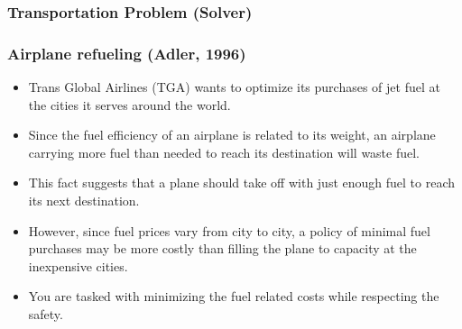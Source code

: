 \documentclass[11pt]{beamer}
\begin{document}
\begin{frame}
\frametitle{Transportation Problem (Solver)}

\end{frame}

\begin{frame}
\frametitle{Airplane refueling (Adler, 1996)}
\begin{itemize}
\item Trans Global Airlines (TGA) wants to optimize its purchases of jet fuel at the cities it serves around the world.
\item Since the fuel efficiency of an airplane is related to its weight, an airplane carrying more fuel than needed to reach its destination will waste fuel.
\item This fact suggests that a plane should take off with just enough fuel to reach its next destination.
\item However, since fuel prices vary from city to city, a policy of minimal fuel purchases may be more costly than filling the plane to capacity at the inexpensive cities.
\item You are tasked with minimizing the fuel related costs while respecting the safety.
\end{itemize}

\end{frame}
\end{document}
